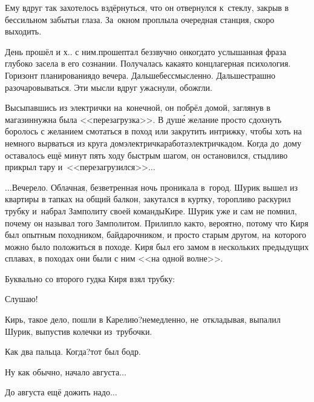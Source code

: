{	Ему вдруг так захотелось вздёрнуться, что он отвернулся к~стеклу, закрыв в бессильном забытьи глаза. За~окном проплыла очередная станция, скоро выходить.
	
	\diagdash День прошёл и х.. с ним.\mdash прошептал беззвучно он\mdash когда\sdash то услышанная фраза глубоко засела в его сознании. Получалась какая\sdash то концлагерная психология. Горизонт планирования\mdash до вечера. Дальше\mdash бессмысленно. Дальше\mdash страшно разочаровываться. Эти мысли вдруг ужаснули, обожгли. %
	
	Высыпавшись из электрички на~конечной, он побрёл домой, заглянув в магазин\mdash нужна была <<перезагрузка>>. В душ\'е желание просто сдохнуть боролось с желанием смотаться в поход или закрутить интрижку, чтобы хоть на немного вырваться из круга дом\nbdash электричка\nbdash работа\nbdash электричка\nbdash дом. Когда до~дому оставалось ещё минут пять ходу быстрым шагом, он остановился, стыдливо прикрыл тару и~<<перезагрузился>>$\ldots$
	
	
	$\ldots$Вечерело. Облачная, безветренная ночь проникала в~город.  Шурик вышел из квартиры в тапках на общий балкон, закутался в куртку, торопливо раскурил трубку и~набрал Замполиту своей команды\mdash Кире. Шурик уже и сам не помнил, почему он называл того Замполитом. Прилипло как\sdash то, вероятно, потому что Киря был опытным походником, байдарочником, и просто старым другом, на~которого можно было положиться в походе. Киря был его замом в нескольких предыдущих сплавах, в походах они были с ним <<на одной волне>>.

	Буквально со второго гудка Киря взял трубку:
	
	\diagdash Слушаю!
	
	\diagdash Кирь, такое дело, пошли в Карелию?\mdash немедленно, не~откладывая, выпалил Шурик, выпустив колечки из~трубочки.
	
	\diagdash Как два пальца. Когда?\mdash тот был бодр.
	
	\diagdash Ну как обычно, начало августа$\ldots$
	
	\diagdash До августа ещё дожить надо$\ldots$
	
}

